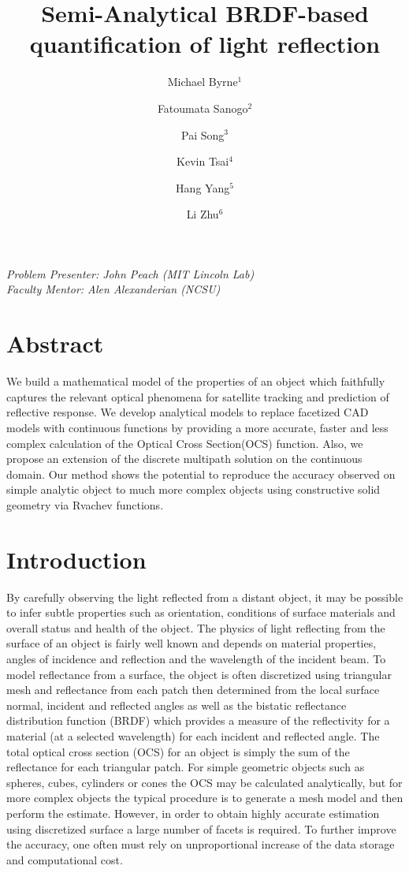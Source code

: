 \documentclass[11pt,reqno]{amsart}
\author{Michael Byrne$^1$}
\author{Fatoumata Sanogo$^2$}
\author{Pai Song$^3$}
\author{Kevin Tsai$^4$}
\author{Hang Yang$^5$}
\author{Li Zhu$^6$}
\title{Semi-Analytical BRDF-based quantification of light reflection}
\theoremstyle{definition}
\begin{document}
\maketitle
{\noindent
\textit{Problem Presenter:  John Peach (MIT Lincoln Lab)\\
Faculty Mentor: Alen Alexanderian (NCSU)}}

\tableofcontents

\section{Abstract}

We build a mathematical model of the properties of an object which faithfully captures the relevant optical phenomena for satellite tracking and prediction of reflective response. We develop analytical models to replace facetized CAD models with continuous functions by providing a more accurate, faster and less complex calculation of the Optical Cross Section(OCS) function. Also, we propose an extension of the discrete multipath solution on the continuous domain. Our method shows the potential to reproduce the accuracy observed on simple analytic object to much more complex objects using constructive solid geometry via Rvachev functions.

\section{Introduction}
By carefully observing the light reflected from a distant object, it may be possible to infer subtle properties such as
orientation, conditions of surface materials and overall status and health of the object. The physics of light reflecting from
the surface of an object is fairly well known and depends on material properties, angles of incidence and reflection and the
wavelength of the incident beam. To model reflectance from a surface, the object is often discretized using triangular mesh
and reflectance from each patch then determined from the local surface normal, incident and reflected angles as well as the
bistatic reflectance distribution function (BRDF) which provides a measure of the reflectivity for a material (at a selected
wavelength) for each incident and reflected angle.
The total optical cross section (OCS) for an object is simply the sum of the reflectance for each triangular patch. For
simple geometric objects such as spheres, cubes, cylinders or cones the OCS may be calculated analytically, but for more
complex objects the typical procedure is to generate a mesh model and then perform the estimate. However, in order to obtain highly accurate estimation using discretized surface a large number of facets is required. To further improve the accuracy, one often must rely on unproportional increase of the data storage and computational cost. 
\end{document}
